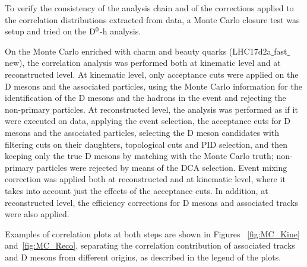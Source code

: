 \label{MCclosure}
To verify the consistency of the analysis chain and of the corrections applied to the  correlation distributions extracted from data, a Monte Carlo closure test was setup and tried on the ${\rm D^0}$-h analysis.

On the Monte Carlo enriched with charm and beauty quarks (LHC17d2a$\_$fast$\_$new), the correlation analysis was performed both at kinematic level and at reconstructed level. At kinematic level, only acceptance cuts were applied on the D mesons and the associated particles, using the Monte Carlo information for the identification of the D mesons and the hadrons in the event and rejecting the non-primary particles. At reconstructed level, the analysis was performed as if it were executed on data, applying the event selection, the acceptance cuts for D mesons and the associated particles, selecting the D meson candidates with filtering cuts on their daughters, topological cuts and PID selection, and then keeping only the true D mesons by matching with the Monte Carlo truth; non-primary particles were rejected by means of the DCA selection. Event mixing correction was applied both at reconstructed and at kinematic level, where it takes into account just the effects of the acceptance cuts. In addition, at reconstructed level, the efficiency corrections for D mesons and associated tracks were also applied.

Examples of correlation plots at both steps are shown in Figures ~\ref{fig:MC_Kine} and~\ref{fig:MC_Reco}, separating the correlation contribution of associated tracks and D mesons from different origins, as described in the legend of the plots.

